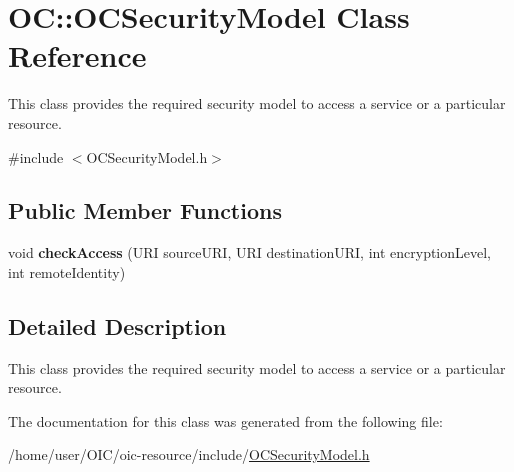 \hypertarget{classOC_1_1OCSecurityModel}{}\section{O\+C\+:\+:O\+C\+Security\+Model Class Reference}
\label{classOC_1_1OCSecurityModel}


This class provides the required security model to access a service or a particular resource.  




{\ttfamily \#include $<$O\+C\+Security\+Model.\+h$>$}

\subsection*{Public Member Functions}
\begin{DoxyCompactItemize}
\item 
\hypertarget{classOC_1_1OCSecurityModel_af4a889dc952e0269fe55b6ead58875eb}{}void {\bfseries check\+Access} (U\+R\+I source\+U\+R\+I, U\+R\+I destination\+U\+R\+I, int encryption\+Level, int remote\+Identity)\label{classOC_1_1OCSecurityModel_af4a889dc952e0269fe55b6ead58875eb}

\end{DoxyCompactItemize}


\subsection{Detailed Description}
This class provides the required security model to access a service or a particular resource. 

The documentation for this class was generated from the following file\+:\begin{DoxyCompactItemize}
\item 
/home/user/\+O\+I\+C/oic-\/resource/include/\hyperlink{OCSecurityModel_8h}{O\+C\+Security\+Model.\+h}\end{DoxyCompactItemize}
